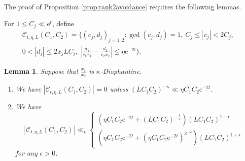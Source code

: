 \documentclass[12pt]{amsart}
\newtheorem{lem}[thm]{Lemma}
\theoremstyle{definition}
\theoremstyle{remark}
\numberwithin{equation}{section}
\newcommand{\e}{\mathrm{e}}
\newcommand{\cC}{\mathcal{C}}
\begin{document}
The proof of Proposition \ref{prop:rank2avoidance} requires the following lemmas.

For $1\leq C_j \ll \e^t$, define
\begin{multline}
  \label{eq:cCdef2}
  \cC_{t,\eta, L}(C_1, C_2) = \{(c_j, d_j)_{j=1,2} : \gcd(c_j,d_j) = 1,\ C_j \leq |c_j| < 2 C_j,\\
  0 < |d_j| \leq 2x_j LC_j,\ |\tfrac{d_1}{c_1x_1} - \tfrac{d_2}{c_2x_2}| \leq \eta \e^{-2t}\}. 
\end{multline}

\begin{lem}
  \label{lem:cCcount}
  Suppose that $\tfrac{x_1}{x_2}$ is $\kappa$-Diophantine.
  \begin{enumerate}[{\rm (i)}]
  \item We have $|\cC_{t, \eta, L}(C_1, C_2)| = 0$ unless $(L C_1C_2)^{-\kappa} \ll \eta C_1C_2 \e^{-2t}$. 
    
  \item
    We have
    \begin{equation}
      \label{eq:cCcount}
      |\cC_{t, \eta, L}(C_1,C_2)|\ll_\epsilon
      \begin{cases}
        (\eta C_1C_2\e^{-2t} +(LC_1C_2)^{-\frac{1}{\kappa}})(LC_1C_2)^{1+\epsilon} \\
        (\eta C_1C_2\e^{-2t} +(\eta C_1C_2\e^{-2t})^{\kappa^{-2}})(LC_1C_2)^{1+\epsilon}
      \end{cases}
    \end{equation}
    for any $\epsilon > 0$.
  \end{enumerate}
\end{lem}
\end{document}
